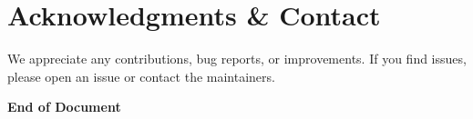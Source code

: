 \documentclass[12pt,a4paper]{article}
\begin{document}
\section{Acknowledgments \& Contact}
\label{sec:acknowledgments}
We appreciate any contributions, bug reports, or improvements. If you find issues, please open an issue or contact the maintainers.

\vfill
\begin{center}
\textbf{End of Document}
\end{center}
\end{document}
